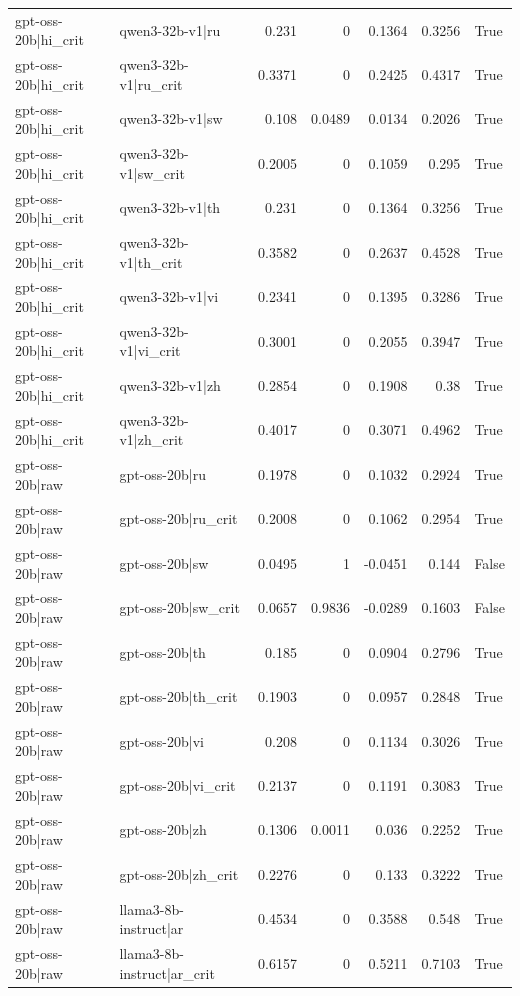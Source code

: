 \begin{table}
\begin{tabular}{l l r r r r l}
gpt-oss-20b|hi_crit & qwen3-32b-v1|ru & 0.231 & 0 & 0.1364 & 0.3256 & True \\
gpt-oss-20b|hi_crit & qwen3-32b-v1|ru_crit & 0.3371 & 0 & 0.2425 & 0.4317 & True \\
gpt-oss-20b|hi_crit & qwen3-32b-v1|sw & 0.108 & 0.0489 & 0.0134 & 0.2026 & True \\
gpt-oss-20b|hi_crit & qwen3-32b-v1|sw_crit & 0.2005 & 0 & 0.1059 & 0.295 & True \\
gpt-oss-20b|hi_crit & qwen3-32b-v1|th & 0.231 & 0 & 0.1364 & 0.3256 & True \\
gpt-oss-20b|hi_crit & qwen3-32b-v1|th_crit & 0.3582 & 0 & 0.2637 & 0.4528 & True \\
gpt-oss-20b|hi_crit & qwen3-32b-v1|vi & 0.2341 & 0 & 0.1395 & 0.3286 & True \\
gpt-oss-20b|hi_crit & qwen3-32b-v1|vi_crit & 0.3001 & 0 & 0.2055 & 0.3947 & True \\
gpt-oss-20b|hi_crit & qwen3-32b-v1|zh & 0.2854 & 0 & 0.1908 & 0.38 & True \\
gpt-oss-20b|hi_crit & qwen3-32b-v1|zh_crit & 0.4017 & 0 & 0.3071 & 0.4962 & True \\
gpt-oss-20b|raw & gpt-oss-20b|ru & 0.1978 & 0 & 0.1032 & 0.2924 & True \\
gpt-oss-20b|raw & gpt-oss-20b|ru_crit & 0.2008 & 0 & 0.1062 & 0.2954 & True \\
gpt-oss-20b|raw & gpt-oss-20b|sw & 0.0495 & 1 & -0.0451 & 0.144 & False \\
gpt-oss-20b|raw & gpt-oss-20b|sw_crit & 0.0657 & 0.9836 & -0.0289 & 0.1603 & False \\
gpt-oss-20b|raw & gpt-oss-20b|th & 0.185 & 0 & 0.0904 & 0.2796 & True \\
gpt-oss-20b|raw & gpt-oss-20b|th_crit & 0.1903 & 0 & 0.0957 & 0.2848 & True \\
gpt-oss-20b|raw & gpt-oss-20b|vi & 0.208 & 0 & 0.1134 & 0.3026 & True \\
gpt-oss-20b|raw & gpt-oss-20b|vi_crit & 0.2137 & 0 & 0.1191 & 0.3083 & True \\
gpt-oss-20b|raw & gpt-oss-20b|zh & 0.1306 & 0.0011 & 0.036 & 0.2252 & True \\
gpt-oss-20b|raw & gpt-oss-20b|zh_crit & 0.2276 & 0 & 0.133 & 0.3222 & True \\
gpt-oss-20b|raw & llama3-8b-instruct|ar & 0.4534 & 0 & 0.3588 & 0.548 & True \\
gpt-oss-20b|raw & llama3-8b-instruct|ar_crit & 0.6157 & 0 & 0.5211 & 0.7103 & True \\

\end{tabular}
\end{table}
